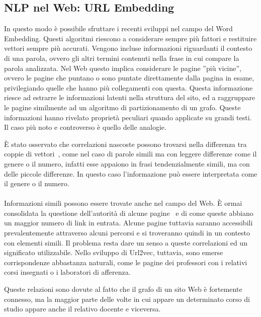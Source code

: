 \subsection{NLP nel Web: URL Embedding}
In questo modo è possibile sfruttare i recenti sviluppi nel campo del Word Embedding. Questi algoritmi riescono a considerare sempre più fattori e restituire vettori sempre più accurati. Vengono incluse informazioni riguardanti il contesto di una parola, ovvero gli altri termini contenuti nella frase in cui compare la parola analizzata. Nel Web questo implica considerare le pagine ''più vicine'', ovvero le pagine che puntano o sono puntate direttamente dalla pagina in esame, privilegiando quelle che hanno più collegamenti con questa. Questa informazione riesce ad estrarre le informazioni latenti nella struttura del sito, ed a raggruppare le pagine similmente ad un algoritmo di partizionamento di un grafo. Queste informazioni hanno rivelato proprietà peculiari quando applicate su grandi testi. Il caso più noto e controverso è quello delle analogie. 

È stato osservato che correlazioni nascoste possono trovarsi nella differenza tra coppie di vettori~\cite{Mikolov13}, come nel caso di parole simili ma con leggere differenze come il genere o il numero, infatti esse appaiono in frasi tendenzialmente simili, ma con delle piccole differenze. In questo caso l'informazione può essere interpretata come il genere o il numero.
\\\\
Informazioni simili possono essere trovate anche nel campo del Web. È ormai consolidata la questione dell'autorità di alcune pagine~\cite{Kleinberg99} e di come queste abbiano un maggior numero di link in entrata. Alcune pagine tuttavia saranno accessibili prevalentemente attraverso alcuni percorsi e si troveranno quindi in un contesto con elementi simili. Il problema resta dare un senso a queste correlazioni ed un significato utilizzabile. Nello sviluppo di Url2vec, tuttavia, sono emerse corrispondenze abbastanza naturali, come le pagine dei professori con i relativi corsi insegnati o i laboratori di afferenza. 

Queste relazioni sono dovute al fatto che il grafo di un sito Web è fortemente connesso, ma la maggior parte delle volte in cui appare un determinato corso di studio appare anche il relativo docente e viceversa. 

